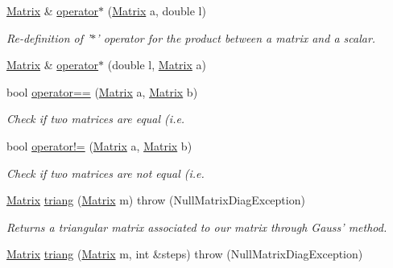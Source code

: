 \begin{CompactItemize}
\hyperlink{classgrassmann_1_1Matrix}{Matrix} \& \hyperlink{classgrassmann_1_1Matrix_91ab0c09218b5b306a7ae46dd1ae6b71}{operator$\ast$} (\hyperlink{classgrassmann_1_1Matrix}{Matrix} a, double l)
\begin{CompactList}\small\item\em Re-definition of '$\ast$' operator for the product between a matrix and a scalar. \item\end{CompactList}\item 
\hyperlink{classgrassmann_1_1Matrix}{Matrix} \& \hyperlink{classgrassmann_1_1Matrix_dfe35f7b86d2a6a1ea631d20038b88c9}{operator$\ast$} (double l, \hyperlink{classgrassmann_1_1Matrix}{Matrix} a)
\item 
bool \hyperlink{classgrassmann_1_1Matrix_f90a77a60d74b87ece26c07d2dc544ef}{operator==} (\hyperlink{classgrassmann_1_1Matrix}{Matrix} a, \hyperlink{classgrassmann_1_1Matrix}{Matrix} b)
\begin{CompactList}\small\item\em Check if two matrices are equal (i.e. \item\end{CompactList}\item 
bool \hyperlink{classgrassmann_1_1Matrix_8cbc99e34ef59ed0adefd4f425705724}{operator!=} (\hyperlink{classgrassmann_1_1Matrix}{Matrix} a, \hyperlink{classgrassmann_1_1Matrix}{Matrix} b)
\begin{CompactList}\small\item\em Check if two matrices are not equal (i.e. \item\end{CompactList}\item 
\hyperlink{classgrassmann_1_1Matrix}{Matrix} \hyperlink{classgrassmann_1_1Matrix_38aaf4ec8160006c88070b706925492d}{triang} (\hyperlink{classgrassmann_1_1Matrix}{Matrix} m)  throw (NullMatrixDiagException)
\begin{CompactList}\small\item\em Returns a triangular matrix associated to our matrix through Gauss' method. \item\end{CompactList}\item 
\hyperlink{classgrassmann_1_1Matrix}{Matrix} \hyperlink{classgrassmann_1_1Matrix_8f41e07e9806c67a29a10416a430f579}{triang} (\hyperlink{classgrassmann_1_1Matrix}{Matrix} m, int \&steps)  throw (NullMatrixDiagException)
\end{CompactItemize}


